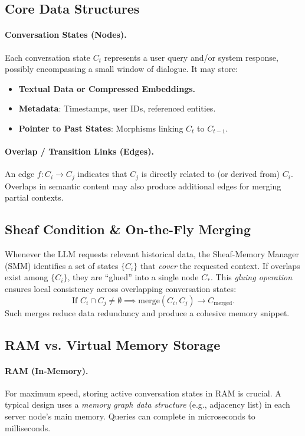 \documentclass{article}
\begin{document}
\subsection{Core Data Structures}
\label{subsec:core_structs}

\paragraph{Conversation States (Nodes).}
Each conversation state $C_t$ represents a user query and/or system response, possibly encompassing a small window of dialogue. It may store:
\begin{itemize}
    \item \textbf{Textual Data or Compressed Embeddings.}
    \item \textbf{Metadata}: Timestamps, user IDs, referenced entities.
    \item \textbf{Pointer to Past States}: Morphisms linking $C_t$ to $C_{t-1}$.
\end{itemize}

\paragraph{Overlap / Transition Links (Edges).}
An edge $f: C_i \to C_j$ indicates that $C_j$ is directly related to (or derived from) $C_i$. Overlaps in semantic content may also produce additional edges for merging partial contexts.

\subsection{Sheaf Condition \& On-the-Fly Merging}

Whenever the LLM requests relevant historical data, the Sheaf-Memory Manager (SMM) identifies a set of states $\{C_i\}$ that \emph{cover} the requested context. If overlaps exist among $\{C_i\}$, they are ``glued'' into a single node $C_{*}$. This \emph{gluing operation} ensures local consistency across overlapping conversation states:
\[
  \text{If } C_i \cap C_j \neq \emptyset \implies \text{merge}(C_i, C_j) \to C_{\mathrm{merged}}.
\]
Such merges reduce data redundancy and produce a cohesive memory snippet.

\subsection{RAM vs. Virtual Memory Storage}

\paragraph{RAM (In-Memory).}
For maximum speed, storing active conversation states in RAM is crucial. A typical design uses a \emph{memory graph data structure} (e.g., adjacency list) in each server node’s main memory. Queries can complete in microseconds to milliseconds.
\end{document}
